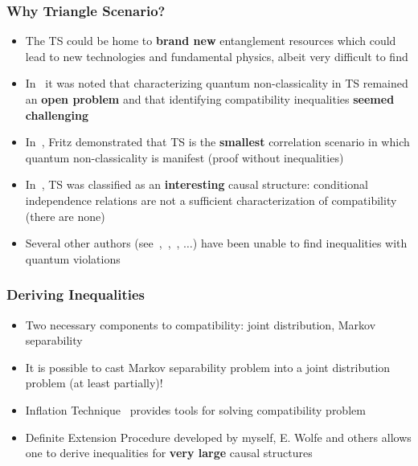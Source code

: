 \documentclass[
    hyperref={bookmarks=false},%
    xcolor={dvipsnames},
]{beamer}
\renewcommand{\term}[1]{\textcolor{Mahogany}{#1}}
\begin{document}
\begin{frame}
    \frametitle{Why Triangle Scenario?}
    \begin{itemize}
        \item The TS could be home to \textbf{brand new} entanglement resources which could lead to new technologies and fundamental physics, albeit very difficult to find
        \item In~\cite{Branciard_2012} it was noted that characterizing quantum non-classicality in TS remained an \textbf{open problem} and that identifying compatibility inequalities \textbf{seemed challenging}
        \item In~\cite{Fritz_2012}, Fritz demonstrated that TS is the \textbf{smallest} correlation scenario in which quantum non-classicality is manifest (proof without inequalities)
        \item In~\cite{Henson_2014}, TS was classified as an \textbf{interesting} causal structure: conditional independence relations are not a sufficient characterization of compatibility (there are none)
        \item Several other authors (see~\cite{Steudel_2010},~\cite{Chaves_2014},~\cite{Inflation}, $\ldots$) have been unable to find inequalities with quantum violations
    \end{itemize}
\end{frame}

\begin{frame}
    \frametitle{Deriving Inequalities}
    \begin{itemize}
        \item Two necessary components to compatibility: joint distribution, Markov separability
        \item It is possible to cast Markov separability problem into a joint distribution problem (at least partially)!
        \item \term{Inflation Technique}~\cite{Inflation} provides tools for solving compatibility problem
        \item \term{Definite Extension Procedure} developed by myself, E. Wolfe and others allows one to derive inequalities for \textbf{very large} causal structures
    \end{itemize}
\end{frame}
\end{document}
